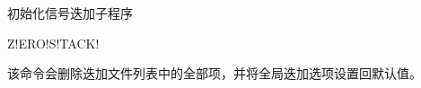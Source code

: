\label{sss:zerostack}

初始化信号迭加子程序

\begin{SACSTX}
    Z!ERO!S!TACK!
\end{SACSTX}

该命令会删除迭加文件列表中的全部项，并将全局迭加选项设置回默认值。
